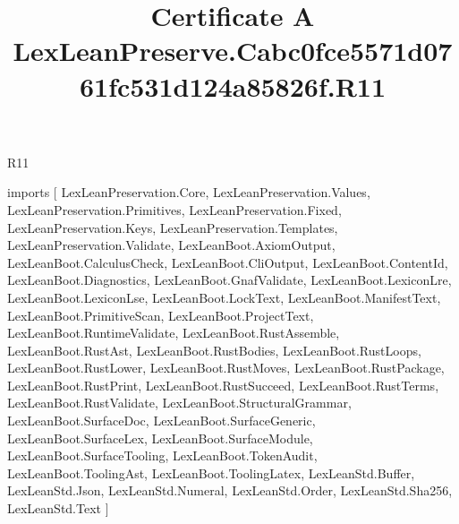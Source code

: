 \begin{lexlean}{R11}
\title{Certificate A LexLeanPreserve.Cabc0fce5571d0761fc531d124a85826f.R11}
\begin{coremodule}
imports [
  LexLeanPreservation.Core,
  LexLeanPreservation.Values,
  LexLeanPreservation.Primitives,
  LexLeanPreservation.Fixed,
  LexLeanPreservation.Keys,
  LexLeanPreservation.Templates,
  LexLeanPreservation.Validate,
  LexLeanBoot.AxiomOutput,
  LexLeanBoot.CalculusCheck,
  LexLeanBoot.CliOutput,
  LexLeanBoot.ContentId,
  LexLeanBoot.Diagnostics,
  LexLeanBoot.GnafValidate,
  LexLeanBoot.LexiconLre,
  LexLeanBoot.LexiconLse,
  LexLeanBoot.LockText,
  LexLeanBoot.ManifestText,
  LexLeanBoot.PrimitiveScan,
  LexLeanBoot.ProjectText,
  LexLeanBoot.RuntimeValidate,
  LexLeanBoot.RustAssemble,
  LexLeanBoot.RustAst,
  LexLeanBoot.RustBodies,
  LexLeanBoot.RustLoops,
  LexLeanBoot.RustLower,
  LexLeanBoot.RustMoves,
  LexLeanBoot.RustPackage,
  LexLeanBoot.RustPrint,
  LexLeanBoot.RustSucceed,
  LexLeanBoot.RustTerms,
  LexLeanBoot.RustValidate,
  LexLeanBoot.StructuralGrammar,
  LexLeanBoot.SurfaceDoc,
  LexLeanBoot.SurfaceGeneric,
  LexLeanBoot.SurfaceLex,
  LexLeanBoot.SurfaceModule,
  LexLeanBoot.SurfaceTooling,
  LexLeanBoot.TokenAudit,
  LexLeanBoot.ToolingAst,
  LexLeanBoot.ToolingLatex,
  LexLeanStd.Buffer,
  LexLeanStd.Json,
  LexLeanStd.Numeral,
  LexLeanStd.Order,
  LexLeanStd.Sha256,
  LexLeanStd.Text
]


\end{coremodule}
\end{lexlean}

